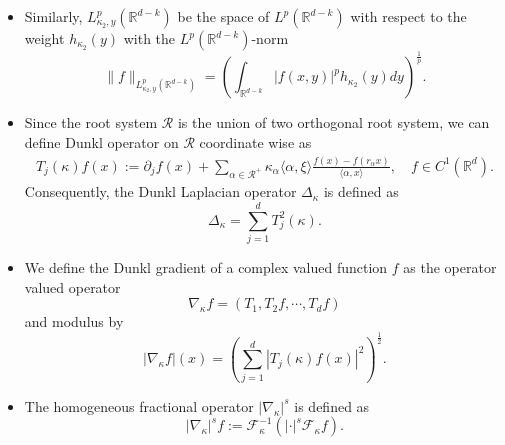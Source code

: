 \documentclass[a4paper,11pt, reqno]{amsart}
\theoremstyle{definition}
\theoremstyle{remark}
\numberwithin{equation}{section}
\begin{document}
\begin{itemize}
		
		\item 	Similarly,  $L_{\kappa_2, y}^p\left(\mathbb{R}^{d-k}\right)$ be the space of $L^p(\mathbb{R}^{d-k})$ with respect to the weight $h_{\kappa_2}(y)$ with the $L^p(\mathbb{R}^{d-k})$-norm
		\begin{equation*}
			\|f\|_{L_{\kappa_2, y}^p\left(\mathbb{R}^{d-k}\right)}=\left(\int_{\mathbb{R}^{d-k}}|f(x,y)|^p  h_{\kappa_2}(y)  dy\right)^\frac{1}{p}.
		\end{equation*}
		\item Since the root system $\mathcal{R}$ is the union of two  orthogonal root system, we can  define Dunkl operator on $\mathcal{R}$ coordinate wise as
        \begin{align*}
		T_{j}(\kappa) f(x):=\partial_{j} f(x)+\sum_{\alpha \in \mathcal{R}^{+}} \kappa_{\alpha }\langle \alpha, \xi\rangle \frac{f(x)-f\left(r_{\alpha} x\right)}{\langle \alpha, x\rangle}, \quad f \in C^{1}(\mathbb{R}^{d}).
	\end{align*}
Consequently, the Dunkl Laplacian operator $\Delta_\kappa $ is defined as $$\Delta_\kappa=\sum_{j=1}^dT^2_{j}(\kappa).$$
           \item We define the Dunkl gradient of a complex valued function $f$ as the operator valued operator $$ \nabla_\kappa f=\left( T_1, T_2f, \cdots, T_df \right)$$ 
           and modulus by 
           $$|\nabla_\kappa f|(x)=\left(\sum_{j=1}^d |T_{j}(\kappa)f(x)|^2\right)^{\frac{1}{2}}.$$ 
           \item The homogeneous fractional operator $|\nabla_\kappa|^{s}$ is defined as $$|\nabla_\kappa|^{s}f:=\mathcal{F}^{-1}_\kappa\left(|\cdot|^s \mathcal{F}_\kappa f\right).$$

\end{itemize}
\end{document}
